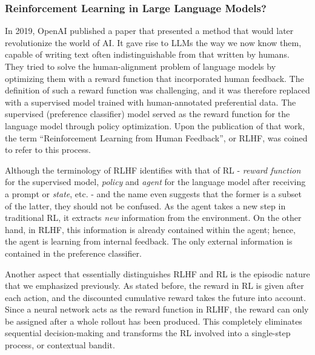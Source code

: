 \subsubsection{Reinforcement Learning in Large Language Models?}
In 2019, OpenAI published a paper that presented a method that would later revolutionize the world of AI. It gave rise to LLMs the way we now know them, capable of writing text often indistinguishable from that written by humans. They tried to solve the human-alignment problem of language models by optimizing them with a reward function that incorporated human feedback. The definition of such a reward function was challenging, and it was therefore replaced with a supervised model trained with human-annotated preferential data. The supervised (preference classifier) model served as the reward function for the language model through policy optimization. Upon the publication of that work, the term ``Reinforcement Learning from Human Feedback'', or RLHF, was coined to refer to this process. 

Although the terminology of RLHF identifies with that of RL - \textit{reward function} for the supervised model, \textit{policy} and \textit{agent} for the language model after receiving a prompt or \textit{state}, etc. - and the name even suggests that the former is a subset of the latter, they should not be confused. As the agent takes a new step in traditional RL, it extracts \textit{new} information from the environment. On the other hand, in RLHF, this information is already contained within the agent; hence, the agent is learning from internal feedback. The only external information is contained in the preference classifier.

Another aspect that essentially distinguishes RLHF and RL is the episodic nature that we emphasized previously. As stated before, the reward in RL is given after each action, and the discounted cumulative reward takes the future into account. Since a neural network acts as the reward function in RLHF, the reward can only be assigned after a whole rollout has been produced. This completely eliminates sequential decision-making and transforms the RL involved into a single-step process, or contextual bandit.